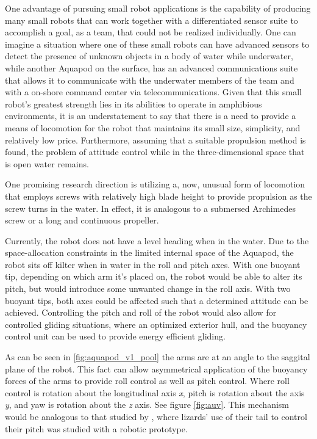 One advantage of pursuing small robot applications is the capability of
producing many small robots that can work together with a differentiated sensor
suite to accomplish a goal, as a team, that could not be realized individually.
One can imagine a situation where one of these small robots can have advanced
sensors to detect the presence of unknown objects in a body of water while
underwater, while another Aquapod on the surface, has an advanced communications
suite that allows it to communicate with the underwater members of the team and
with a on-shore command center via telecommunications.  Given that this small
robot's greatest strength lies in its abilities to operate in amphibious
environments, it is an understatement to say that there is a need to provide a
means of locomotion for the robot that maintains its small size, simplicity, and
relatively low price. Furthermore, assuming that a suitable propulsion method is
found, the problem of attitude control while in the three-dimensional space that
is open water remains.

One promising research direction is utilizing a, now, unusual form of locomotion
that employs screws with relatively high blade height to provide propulsion as
the screw turns in the water. In effect, it is analogous to a submersed
Archimedes screw \cite{Freeberg2010} or a long and continuous
propeller\cite{Cole1961c}.


Currently, the robot does not have a level heading when in the water. Due to the
space-allocation constraints in the limited internal space of the Aquapod, the
robot sits off kilter when in water in the roll and pitch axes. With one buoyant
tip, depending on which arm it’s placed on, the robot would be able to alter its
pitch, but would introduce some unwanted change in the roll axis. With two
buoyant tips, both axes could be affected such that a determined attitude can be
achieved. Controlling the pitch and roll of the robot would also allow for
controlled gliding situations, where an optimized exterior hull, and the
buoyancy control unit can be used to provide energy efficient gliding.

As can be seen in \ref{fig:aquapod_v1_pool} the arms are at an angle to the
saggital plane of the robot. This fact can allow asymmetrical application of the
buoyancy forces of the arms to provide roll control as well as pitch control.
Where roll control is rotation about the longitudinal axis \emph{x}, pitch is
rotation about the axis \emph{y}, and yaw is rotation about the \emph{z} axis.
See figure \ref{fig:auv}. This mechanism would be analogous to that studied by
\cite{Libby2012}, where lizards' use of their tail to control their pitch was
studied with a robotic prototype.

